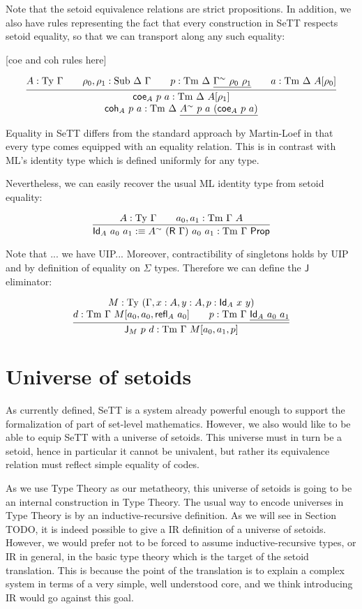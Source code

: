\documentclass{easychair}
\newcommand{\refl}{\textsf{refl}}
\newcommand{\GG}{\Gamma}
\newcommand{\GD}{\Delta}
\newcommand{\R}{\textsf{R}}
\newcommand{\Id}{\textsf{Id}}
\newcommand{\coe}{\textsf{coe}}
\newcommand{\coh}{\textsf{coh}}
\newcommand{\J}{\textsf{J}}
\newcommand{\tyj}[2]{#2 : \Ty\ #1}
\newcommand{\tmj}[3]{#2 : \Tm\ #1\ #3}
\newcommand{\subj}[3]{#1 : \mathrm{Sub}\ #2\ #3}
\newcommand{\Prop}{\textsf{Prop}}
\newcommand{\Ty}{\mathrm{Ty}}
\newcommand{\Tm}{\mathrm{Tm}}
\begin{document}
Note that the setoid equivalence relations are strict propositions. In addition,
we also have rules representing the fact that every construction in SeTT
respects setoid equality, so that we can transport along any such equality:

[coe and coh rules here]

    \[
    \infer{
      \deduce{
        \tmj{\GD}{\coh_A\ p\ a}{\underline{A^\sim\ p\ a\ (\coe_A\ p\ a)}}
      }{
        \tmj{\GD}{\coe_A\ p\ a}{A[\rho_1]}
      }
    }{
      \tyj{\GG}{A} \qquad \subj{\rho_0, \rho_1}{\GD}{\GG} \qquad
      \tmj{\GD}{p}{\underline{\GG^\sim\ \rho_0\ \rho_1}}\qquad
      \tmj{\GD}{a}{A[\rho_0]}
    }
    \]

Equality in SeTT differs from the standard approach by Martin-Loef in that every
type comes equipped with an equality relation. This is in contrast with ML's
identity type which is defined uniformly for any type.

Nevertheless, we can easily recover the usual ML identity type from setoid
equality:

\[
\infer{
  \textsf{Id}_A\ a_0\ a_1 :\equiv A^{\sim}\ (\R\ \GG)\ a_0\ a_1 : \Tm\ \GG\ \Prop
}{
  \tyj{\GG}{A} \qquad \tmj{\GG}{a_0, a_1}{A}
}
\]

Note that ... we have UIP... Moreover, contractibility of singletons holds by
UIP and by definition of equality on $\Sigma$ types. Therefore we can define the
$\J$ eliminator:

\[
\infer{
  \tmj{\GG}{\J_M\ p\ d}{M[a_0, a_1, p]}
}{
  \deduce{
    \tmj{\GG}{d}{M[a_0, a_0, \refl_A\ a_0]}
    \qquad
    \tmj{\GG}{p}{\underline{\Id_A\ a_0\ a_1}}
  }{
  \tyj{(\GG, x : A, y : A, p : \Id_A\ x\ y)}{M}
  }
}
\]


\section{Universe of setoids}

As currently defined, SeTT is a system already powerful enough to support the
formalization of part of set-level mathematics. However, we also would like to
be able to equip SeTT with a universe of setoids. This universe must in turn be
a setoid, hence in particular it cannot be univalent, but rather its equivalence
relation must reflect simple equality of codes.

As we use Type Theory as our metatheory, this universe of setoids is going to be
an internal construction in Type Theory. The usual way to encode universes in
Type Theory is by an inductive-recursive definition. As we will see in Section
TODO, it is indeed possible to give a IR definition of a universe of setoids.
%
However, we would prefer not to be forced to assume inductive-recursive types,
or IR in general, in the basic type theory which is the target of the setoid
translation. This is because the point of the translation is to explain a
complex system in terms of a very simple, well understood core, and we think
introducing IR would go against this goal.
\end{document}
